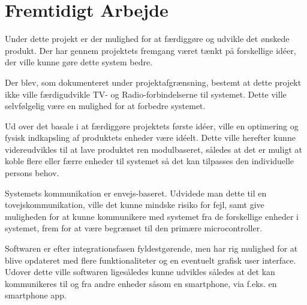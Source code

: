 \section{Fremtidigt Arbejde}
Under dette projekt er der mulighed for at færdiggøre og udvikle det ønskede produkt. Der har gennem projektets fremgang været tænkt på forskellige idéer, der ville kunne gøre dette system bedre.

Der blev, som dokumenteret under projektafgrænsning, bestemt at dette projekt ikke ville færdigudvikle TV- og Radio-forbindelserne til systemet. Dette ville selvfølgelig være en mulighed for at forbedre systemet.

Ud over det basale i at færdiggøre projektets første idéer, ville en optimering og fysisk indkapsling af produktets enheder være idéelt. Dette ville herefter kunne videreudvikles til at lave produktet ren modulbaseret, således at det er muligt at koble flere eller færre enheder til systemet så det kan tilpasses den individuelle persons behov.

Systemets kommunikation er envejs-baseret. Udvidede man dette til en tovejskommunikation, ville det kunne mindske risiko for fejl, samt give muligheden for at kunne kommunikere med systemet fra de forskellige enheder i systemet, frem for at være begrænset til den primære microcontroller.

Softwaren er efter integrationsfasen fyldestgørende, men har rig mulighed for at blive opdateret med flere funktionaliteter og en eventuelt grafisk user interface. Udover dette ville softwaren ligesåledes kunne udvikles således at det kan kommunikeres til og fra andre enheder såsom en smartphone, via f.eks. en smartphone app.